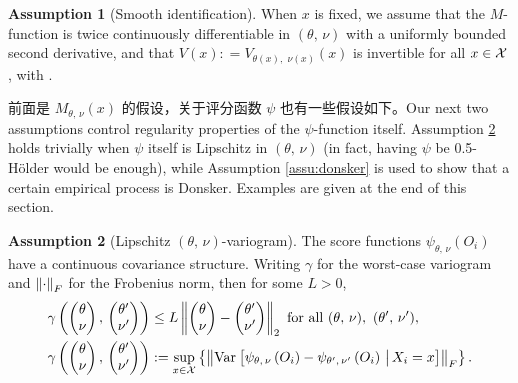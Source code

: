 \documentclass[aos]{imsart}
\theoremstyle{plain}
\theoremstyle{definition}
\newtheorem{assu}{Assumption}
\theoremstyle{remark}
\begin{document}
\begin{CJK}{UTF8}{gbsn}
\begin{assu}[Smooth identification]
\label{assu:identification}
When $x$ is fixed, we assume that the $M$-function is twice continuously differentiable
in $(\theta, \, \nu)$ with a uniformly bounded second derivative, and
that $V(x): = V_{\theta(x), \, \, \nu(x)}(x)$ is invertible for all $x \in \mathcal{X}$, with
.
\end{assu}

前面是 $M_{\theta, \, \nu}(x)$ 的假设，关于评分函数 $\psi$ 也有一些假设如下。Our next two assumptions control regularity properties of the $\psi$-function itself.
Assumption \ref{assu:covariance} holds trivially when $\psi$ itself is
Lipschitz in $(\theta, \, \nu)$ (in fact, having $\psi$ be 0.5-H{\"o}lder would be enough),
while Assumption \ref{assu:donsker} is used to show that a certain empirical process is
Donsker. Examples are given at the end of this section.

\begin{assu}[Lipschitz $(\theta, \, \nu)$-variogram]
\label{assu:covariance}
The score functions $\psi_{\theta, \, \nu}(O_i)$ 
have a continuous covariance structure.
Writing $\gamma$ for the worst-case variogram
and $\left\lVert\cdot\right\rVert_F$ for the Frobenius norm,
then for some $L > 0$,
\begin{equation}
\label{eq:variogram}
\begin{split}
&\gamma\p{ \begin{pmatrix} \theta \\ \nu \end{pmatrix}, \,  \begin{pmatrix} \theta' \\ \nu' \end{pmatrix}} \leq
L \Norm{\begin{pmatrix} \theta \\ \nu \end{pmatrix} -   \begin{pmatrix} \theta' \\ \nu' \end{pmatrix}}_2
\text{ for all } (\theta,\, \nu), \ (\theta',\,\nu'), \\
&\gamma\p{ \begin{pmatrix} \theta \\ \nu \end{pmatrix}, \,  \begin{pmatrix} \theta' \\ \nu' \end{pmatrix}}
:= \sup_{x \in \xx} \cb{\Norm{\Var{\psi_{\theta, \, \nu}\p{O_i} - \psi_{\theta', \, \nu'}\p{O_i} \cond X_i = x}}_F}.
\end{split}
\end{equation}
\end{assu}


\end{CJK}
\end{document}
